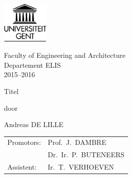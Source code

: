 

\begin{titlepage}

\setlength{\hoffset}{-1in}
\setlength{\voffset}{-1in}
\setlength{\topmargin}{1.5cm}
\setlength{\headheight}{0.5cm}
\setlength{\headsep}{1cm}
\setlength{\oddsidemargin}{3cm}
\setlength{\evensidemargin}{3cm}
\setlength{\footskip}{1.5cm}
\enlargethispage{1cm}


\fontsize{12pt}{14pt}
\selectfont

\begin{center}

\includegraphics[height=2cm]{fig/ruglogo}

\vspace{0.5cm}

Faculty of Engineering and Architecture\\
Departement ELIS\\
2015--2016 \\

\vspace{3.5cm}

\fontsize{17.28pt}{21pt}
\selectfont

Titel

\fontsize{12pt}{14pt}
\selectfont

\vspace{.6cm}

door 

\vspace{.4cm}

Andreas DE LILLE

\vspace{3.5cm}


\begin{tabular}{ll}
Promotors: & Prof.~J.~DAMBRE\\
 & Dr.~Ir.~P.~BUTENEERS\\
Assistent: & Ir.~T.~VERHOEVEN\\
\end{tabular}
 

\vspace{3cm}


\end{center}
\end{titlepage}
